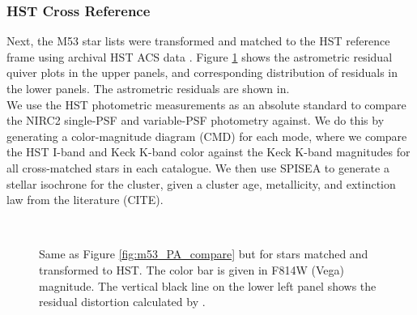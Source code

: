 \documentclass[]{spie}  %
\begin{document}
\subsubsection{HST Cross Reference} \label{sec:m53-hst}

\indent Next, the M53 star lists were transformed and matched to the HST reference frame using archival HST ACS data \cite{service:2016a}. Figure \ref{fig:m53_PA_compare_hst} shows the astrometric residual quiver plots in the upper panels, and corresponding distribution of residuals in the lower panels. The astrometric residuals are shown in.
\\
\indent We use the HST photometric measurements as an absolute standard to compare the NIRC2 single-PSF and variable-PSF photometry against. We do this by generating a color-magnitude diagram (CMD) for each mode, where we compare the HST I-band and Keck K-band color against the Keck K-band magnitudes for all cross-matched stars in each catalogue. We then use SPISEA to generate a stellar isochrone for the cluster, given a cluster age, metallicity, and extinction law from the literature (CITE).

\begin{figure}[!h]
  \centering
  \\
  \hspace{-1cm}
  \caption{Same as Figure \ref{fig:m53_PA_compare} but for stars matched and transformed to HST. The color bar is given in F814W (Vega) magnitude. The vertical black line on the lower left panel shows the residual distortion calculated by \cite{service:2016a}.} \label{fig:m53_PA_compare_hst}
\end{figure}
\end{document}
